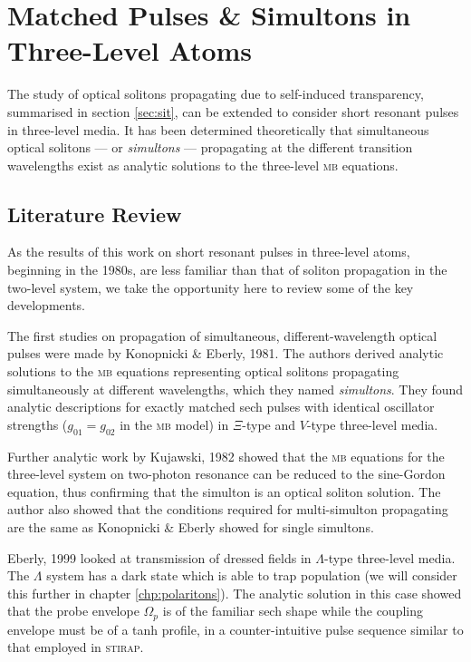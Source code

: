 \section[Matched Pulses \& Simultons]
    {Matched Pulses \& Simultons in Three-Level Atoms}
  \label{sec:nonlinear_simultons}

      The study of optical solitons propagating due to self-induced
      transparency, summarised in section \ref{sec:sit}, can be extended to
      consider short resonant pulses in three-level media. It has been
      determined theoretically that simultaneous optical solitons --- or
      \textit{simultons} --- propagating at the different transition wavelengths
      exist as analytic solutions to the three-level \textsc{mb} equations.

  \subsection{Literature Review}

    As the results of this work on short resonant pulses in three-level atoms,
    beginning in the 1980s, are less familiar than that of soliton propagation
    in the two-level system, we take the opportunity here to review some of the
    key developments.

    The first studies on propagation of simultaneous, different-wavelength
    optical pulses were made by Konopnicki \& Eberly,
    1981\cite{Konopnicki1981,Konopnicki1981a}. The authors derived analytic
    solutions to the \textsc{mb} equations representing optical solitons
    propagating simultaneously at different wavelengths, which they named
    \textit{simultons}. They found analytic descriptions for exactly matched
    sech pulses with identical oscillator strengths (\ie $g_{01} = g_{02}$ in
    the \textsc{mb} model) in $\Xi$-type and $V$-type three-level media.

    Further analytic work by Kujawski, 1982\cite{Kujawski1982} showed that the
    \textsc{mb} equations for the three-level system on two-photon resonance can
    be reduced to the sine-Gordon equation\cite{lamb1980elements}, thus
    confirming that the simulton is an optical soliton solution. The author also
    showed that the conditions required for multi-simulton propagating are the
    same as Konopnicki \& Eberly showed for single simultons.

    Eberly, 1999 looked at transmission of dressed fields in $\Lambda$-type
    three-level media\cite{Eberly1999}. The $\Lambda$ system has a dark state
    which is able to trap population (we will consider this further in chapter
    \ref{chp:polaritons}). The analytic solution in this case showed that the
    probe envelope $\Omega_p$ is of the familiar sech shape while the coupling
    envelope must be of a tanh profile, in a counter-intuitive pulse sequence
    similar to that employed in \textsc{stirap}.

